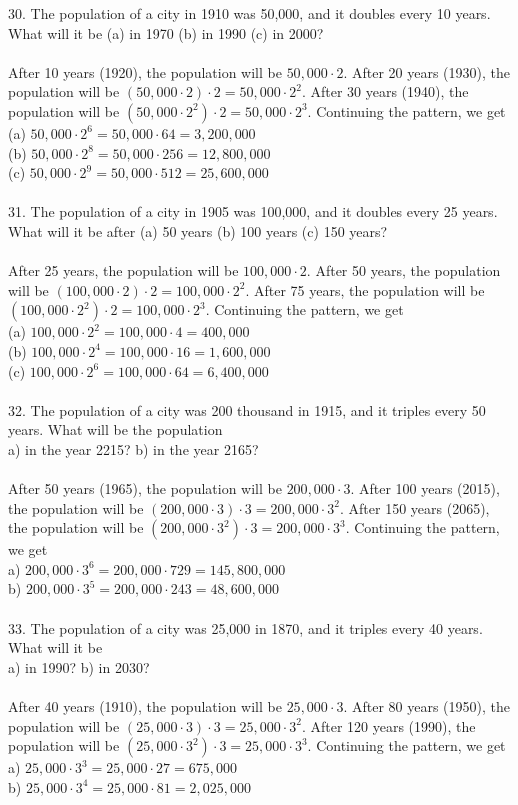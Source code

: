 \documentclass[12pt]{article}
\begin{document}
30. The population of a city in 1910 was 50,000, and it doubles every 10 years. What will it be (a) in 1970 (b) in 1990 (c) in 2000? \\
\\
After 10 years (1920), the population will be $50,000\cdot2$. After 20 years (1930), the population will be $(50,000\cdot2)\cdot2=50,000\cdot2^2$. After 30 years (1940), the population will be $(50,000\cdot2^2)\cdot2=50,000\cdot2^3$. Continuing the pattern, we get \\
(a) $50,000\cdot2^6=50,000\cdot64=3,200,000$ \\
(b) $50,000\cdot2^8=50,000\cdot256=12,800,000$ \\
(c) $50,000\cdot2^9=50,000\cdot512=25,600,000$ \\
\\
31. The population of a city in 1905 was 100,000, and it doubles every 25 years. What will it be after (a) 50 years (b) 100 years (c) 150 years? \\
\\
After 25 years, the population will be $100,000\cdot2$. After 50 years, the population will be $(100,000\cdot2)\cdot2=100,000\cdot2^2$. After 75 years, the population will be $(100,000\cdot2^2)\cdot2=100,000\cdot2^3$. Continuing the pattern, we get \\
(a) $100,000\cdot2^2=100,000\cdot4=400,000$ \\
(b) $100,000\cdot2^4=100,000\cdot16=1,600,000$ \\
(c) $100,000\cdot2^6=100,000\cdot64=6,400,000$ \\
\\
32. The population of a city was 200 thousand in 1915, and it triples every 50 years. What will be the population \\
a) in the year 2215? \hspace{2cm} b) in the year 2165? \\
\\
After 50 years (1965), the population will be $200,000\cdot3$. After 100 years (2015), the population will be $(200,000\cdot3)\cdot3=200,000\cdot3^2$. After 150 years (2065), the population will be $(200,000\cdot3^2)\cdot3=200,000\cdot3^3$. Continuing the pattern, we get \\
a) $200,000\cdot3^6=200,000\cdot729=145,800,000$ \\
b) $200,000\cdot3^5=200,000\cdot243=48,600,000$ \\
\\
33. The population of a city was 25,000 in 1870, and it triples every 40 years. What will it be \\
a) in 1990? \hspace{5cm} b) in 2030? \\
\\
After 40 years (1910), the population will be $25,000\cdot3$. After 80 years (1950), the population will be $(25,000\cdot3)\cdot3=25,000\cdot3^2$. After 120 years (1990), the population will be $(25,000\cdot3^2)\cdot3=25,000\cdot3^3$. Continuing the pattern, we get \\
a) $25,000\cdot3^3=25,000\cdot27=675,000$ \\
b) $25,000\cdot3^4=25,000\cdot81=2,025,000$
\end{document}
